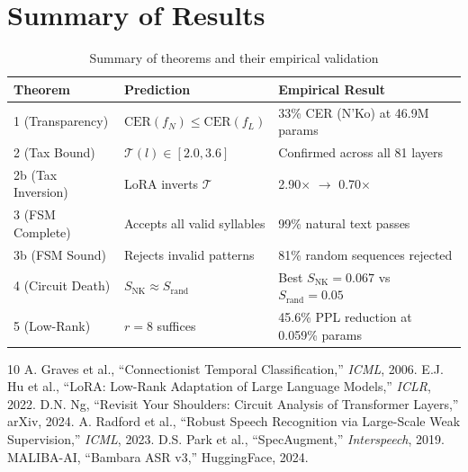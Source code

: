 \documentclass[11pt]{article}
\theoremstyle{remark}
\begin{document}
\section*{Summary of Results}

\begin{table}[h]
\centering
\caption{Summary of theorems and their empirical validation}
\begin{tabular}{lll}
\toprule
Theorem & Prediction & Empirical Result \\
\midrule
1 (Transparency) & $\text{CER}(f_N) \leq \text{CER}(f_L)$ & 33\% CER (N'Ko) at 46.9M params \\
2 (Tax Bound) & $\mathcal{T}(l) \in [2.0, 3.6]$ & Confirmed across all 81 layers \\
2b (Tax Inversion) & LoRA inverts $\mathcal{T}$ & 2.90$\times$ $\to$ 0.70$\times$ \\
3 (FSM Complete) & Accepts all valid syllables & 99\% natural text passes \\
3b (FSM Sound) & Rejects invalid patterns & 81\% random sequences rejected \\
4 (Circuit Death) & $S_{\text{NK}} \approx S_{\text{rand}}$ & Best $S_{\text{NK}} = 0.067$ vs $S_{\text{rand}} = 0.05$ \\
5 (Low-Rank) & $r = 8$ suffices & 45.6\% PPL reduction at 0.059\% params \\
\bottomrule
\end{tabular}
\end{table}

\begin{thebibliography}{10}
 A. Graves et al., ``Connectionist Temporal Classification,'' \emph{ICML}, 2006.
 E.J. Hu et al., ``LoRA: Low-Rank Adaptation of Large Language Models,'' \emph{ICLR}, 2022.
 D.N. Ng, ``Revisit Your Shoulders: Circuit Analysis of Transformer Layers,'' arXiv, 2024.
 A. Radford et al., ``Robust Speech Recognition via Large-Scale Weak Supervision,'' \emph{ICML}, 2023.
 D.S. Park et al., ``SpecAugment,'' \emph{Interspeech}, 2019.
 MALIBA-AI, ``Bambara ASR v3,'' HuggingFace, 2024.
\end{thebibliography}
\end{document}
